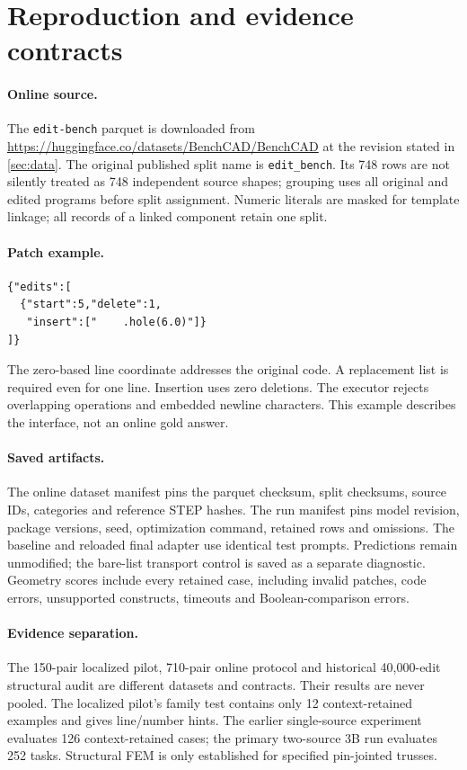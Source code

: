 \clearpage
\appendix
\section{Reproduction and evidence contracts}
\label{sec:appendix}
\paragraph{Online source.}
The \texttt{edit-bench} parquet is downloaded from \url{https://huggingface.co/datasets/BenchCAD/BenchCAD} at the revision stated in \cref{sec:data}. The original published split name is \texttt{edit\_bench}. Its 748 rows are not silently treated as 748 independent source shapes; grouping uses all original and edited programs before split assignment. Numeric literals are masked for template linkage; all records of a linked component retain one split.

\paragraph{Patch example.}
\begin{lstlisting}
{"edits":[
  {"start":5,"delete":1,
   "insert":["    .hole(6.0)"]}
]}
\end{lstlisting}
The zero-based line coordinate addresses the original code. A replacement list is required even for one line. Insertion uses zero deletions. The executor rejects overlapping operations and embedded newline characters. This example describes the interface, not an online gold answer.

\paragraph{Saved artifacts.}
The online dataset manifest pins the parquet checksum, split checksums, source IDs, categories and reference STEP hashes. The run manifest pins model revision, package versions, seed, optimization command, retained rows and omissions. The baseline and reloaded final adapter use identical test prompts. Predictions remain unmodified; the bare-list transport control is saved as a separate diagnostic. Geometry scores include every retained case, including invalid patches, code errors, unsupported constructs, timeouts and Boolean-comparison errors.

\paragraph{Evidence separation.}
The 150-pair localized pilot, 710-pair online protocol and historical 40,000-edit structural audit are different datasets and contracts. Their results are never pooled. The localized pilot's family test contains only 12 context-retained examples and gives line/number hints. The earlier single-source experiment evaluates 126 context-retained cases; the primary two-source 3B run evaluates 252 tasks. Structural FEM is only established for specified pin-jointed trusses.

